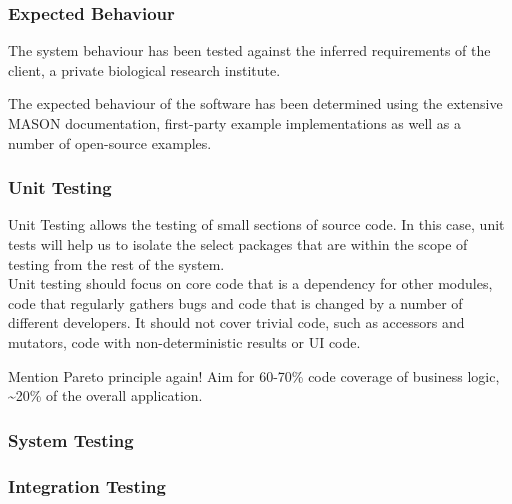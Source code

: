 \documentclass[11pt]{article}
\begin{document}
\subsubsection{Expected Behaviour}
The system behaviour has been tested against the inferred requirements of the client, a private biological research institute.

The expected behaviour of the software has been determined using the extensive MASON documentation\cite{mason_doc}, first-party example implementations as well as a number of open-source examples\cite{ppsim}.

\subsubsection{Unit Testing}
Unit Testing allows the testing of small sections of source code. In this case, unit tests will help us to isolate the select packages that are within the scope of testing from the rest of the system.
\\

Unit testing should focus on core code that is a dependency for other modules, code that regularly gathers bugs and code that is changed by a number of different developers. It should not cover trivial code, such as accessors and mutators, code with non-deterministic results or UI code.\cite{dont_test_blindly}

Mention Pareto principle again!
Aim for 60-70\% code coverage of business logic, %
\textasciitilde 20\% of the overall application.


\subsubsection{System Testing}


\subsubsection{Integration Testing}
\end{document}
